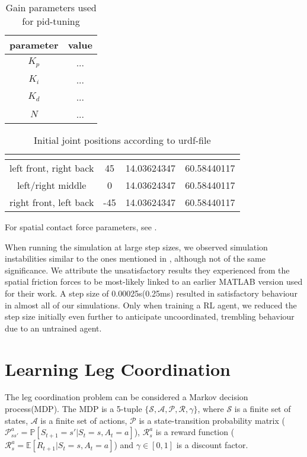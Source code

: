 \begin{table}[h]
	\centering
	\begin{tabular}{| c | c |}
		\hline
		parameter & value\\
		\hline
		$K_p$ & ... \\
		\hline
		$K_i$ & ... \\
		\hline
		$K_d$ & ... \\
		\hline
		$N$ & ... \\
		\hline
	\end{tabular}
	\caption{Gain parameters used for pid-tuning}
	\label{table: PID parameters}
\end{table}

\begin{table}
	\centering
	\begin{tabular}{| c | c | c | c |} 
		\hline
		 & \textbf{\textalpha} & \textbf{\textbeta} & \textbf{\textgamma} \\ [0.5ex] 
		\hline
		left front, right back & 45 & 14.03624347 & 60.58440117  \\ 
		\hline
		left/right middle & 0 & 14.03624347 & 60.58440117 \\
		\hline
		right front, left back & -45 & 14.03624347 & 60.58440117 \\
		\hline
	\end{tabular}
	\caption{Initial joint positions according to urdf-file}
	\label{table:Initial joint positions}
\end{table}

For spatial contact force parameters, see \parencite{trotta2022walking}.

When running the simulation at large step sizes, we observed simulation instabilities similar to the ones mentioned in \parencite{thilderkvist2015motion}, although not of the same significance.
We attribute the unsatisfactory results they experienced from the spatial friction forces to be most-likely linked to an earlier MATLAB version used for their work.
A step size of 0.00025s(0.25ms) resulted in satisfactory behaviour in almost all of our simulations.
Only when training a RL agent, we reduced the step size initially even further to anticipate uncoordinated, trembling behaviour due to an untrained agent.


\section{Learning Leg Coordination}
The leg coordination problem can be considered a Markov decision process(MDP).
The MDP is a 5-tuple $\mathcal{\{S,A,P,R,\gamma\}}$, where $\mathcal{S}$ is a finite set of states, $\mathcal{A}$ is a finite set of actions, $\mathcal{P}$ is a state-transition probability matrix ($\mathcal{P}_{ss'}^a=\mathbb{P}[S_{t+1}=s' | S_t=s, A_t=a]$), $\mathcal{R}_s^a$ is a reward function ($\mathcal{R}_s^a = \mathbb{E}[R_{t+1} | S_t=s, A_t=a]$) and $\gamma \in [0,1]$ is a discount factor.


